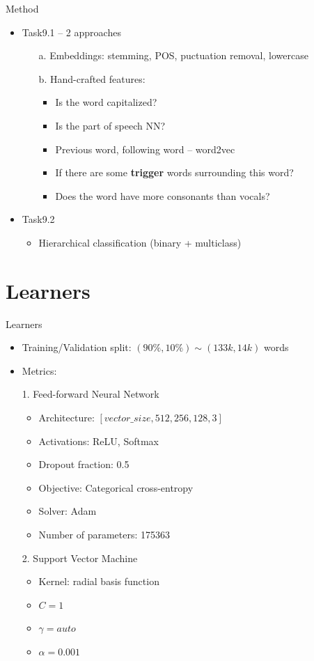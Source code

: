 \documentclass[11pt]{beamer}
\begin{document}
\begin{frame}{Method}
\begin{itemize}
\item Task9.1 -- 2 approaches
\begin{itemize}
	\item[a.] Embeddings: stemming, POS, puctuation removal, lowercase
	\item[b.] Hand-crafted features:\\
	\begin{itemize}
		\item Is the word capitalized?
		\item Is the part of speech NN?
		\item Previous word, following word -- word2vec
		\item If there are some \textbf{trigger} words surrounding this word?
		\item Does the word have more consonants than vocals?
	\end{itemize}
\end{itemize}
\item Task9.2
\begin{itemize}
\item Hierarchical classification (binary + multiclass)
\end{itemize}
\end{itemize}
\end{frame}

\section{Learners}
\begin{frame}{Learners}
\begin{itemize}
\item Training/Validation split: $(90\%,10\%) \sim (133k, 14k)$ words 
\item Metrics:
\item[1.] Feed-forward Neural Network
\begin{itemize}
\item Architecture: $[vector\_size, 512, 256, 128, 3]$
\item Activations: ReLU, Softmax
\item Dropout fraction: 0.5
\item Objective: Categorical cross-entropy
\item Solver: Adam
\item Number of parameters: 175363
\end{itemize}
\item[2.] Support Vector Machine
\begin{itemize}
\item Kernel: radial basis function
\item $C=1$
\item $\gamma = auto$
\item $\alpha = 0.001$
\end{itemize}
\end{itemize}
\end{frame}
\end{document}
